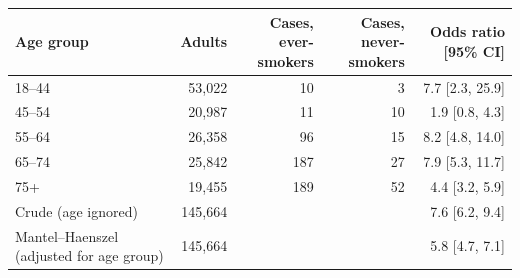 \begin{tabular}{lrrrr}
\toprule
Age group & Adults & \makecell[b]{Cases,\\{}ever-smokers} & \makecell[b]{Cases,\\{}never-smokers} & Odds ratio [95\% CI] \\
\midrule
18--44 & 53,022 & 10 & 3 & 7.7 [2.3, 25.9] \\
45--54 & 20,987 & 11 & 10 & 1.9 [0.8, 4.3] \\
55--64 & 26,358 & 96 & 15 & 8.2 [4.8, 14.0] \\
65--74 & 25,842 & 187 & 27 & 7.9 [5.3, 11.7] \\
75+ & 19,455 & 189 & 52 & 4.4 [3.2, 5.9] \\
\midrule
Crude (age ignored) & 145,664 &  &  & 7.6 [6.2, 9.4] \\
Mantel--Haenszel (adjusted for age group) & 145,664 &  &  & 5.8 [4.7, 7.1] \\
\bottomrule
\end{tabular}
